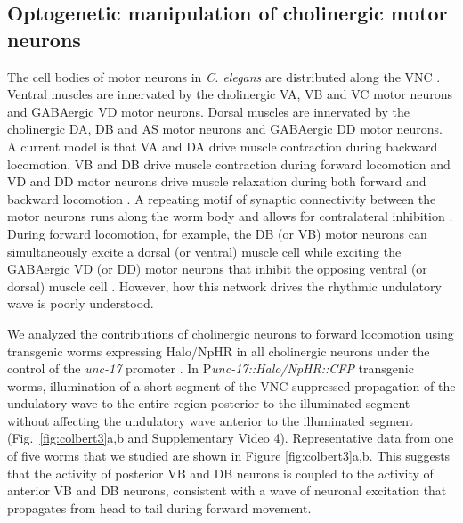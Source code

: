 \subsection{Optogenetic manipulation of cholinergic motor neurons}
The cell bodies of motor neurons in \textit{C. elegans} are distributed along the VNC \citep{von_stetina_motor_2006,wicks_dynamic_1996}. Ventral muscles are innervated by the cholinergic VA, VB and VC motor neurons and GABAergic VD motor neurons. Dorsal muscles are innervated by the cholinergic DA, DB and AS motor neurons and GABAergic DD motor neurons\citep{white_structure_1976,chen_wiring_2006}. A current model is that VA and DA drive muscle contraction during backward locomotion, VB and DB drive muscle contraction during forward locomotion and VD and DD motor neurons drive muscle relaxation during both forward and backward locomotion \citep{wicks_dynamic_1996,von_stetina_motor_2006,haspel_motoneurons_2010}. A repeating motif of synaptic connectivity between the motor neurons runs along the worm body and allows for contralateral inhibition \citep{von_stetina_motor_2006}. During forward locomotion, for example, the DB (or VB) motor neurons can simultaneously excite a dorsal (or ventral) muscle cell while exciting the GABAergic VD (or DD) motor neurons that inhibit the opposing ventral (or dorsal) muscle cell \citep{white_structure_1976,chen_wiring_2006}. However, how this network drives the rhythmic undulatory wave is poorly understood.

We analyzed the contributions of cholinergic neurons to forward locomotion using transgenic worms expressing Halo/NpHR in all cholinergic neurons under the control of the \textit{unc-17} promoter \citep{roghani_molecular_1994}. In P\textit{unc-17::Halo/NpHR::CFP} transgenic worms, illumination of a short segment of the VNC suppressed propagation of the undulatory wave to the entire region posterior to the illuminated segment without affecting the undulatory wave anterior to the illuminated segment (Fig.~\ref{fig:colbert3}a,b and Supplementary Video 4). Representative data from one of five worms that we studied are shown in Figure \ref{fig:colbert3}a,b. This suggests that the activity of posterior VB and DB neurons is coupled to the activity of anterior VB and DB neurons, consistent with a wave of neuronal excitation that propagates from head to tail during forward movement.

